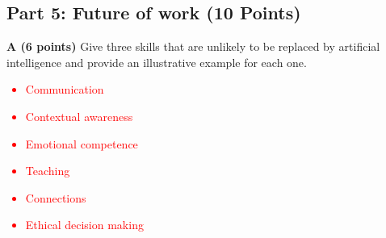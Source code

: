 \documentclass[12pt]{scrartcl}
\begin{document}
\subsection*{Part 5: Future of work (10 Points)}

\textbf{A (6 points)} Give three skills that are unlikely to be replaced by artificial intelligence and provide an illustrative example for each one.

\textcolor{red}{
	\begin{itemize}
		\item Communication
		\item Contextual awareness
		\item Emotional competence
		\item Teaching
		\item Connections
		\item Ethical decision making
	\end{itemize}
}
\end{document}
